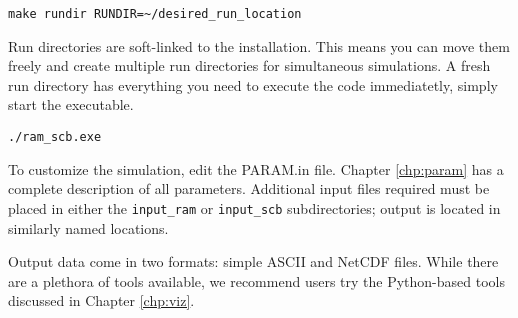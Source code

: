 \begin{verbatim}
make rundir RUNDIR=~/desired_run_location
\end{verbatim}

Run directories are soft-linked to the installation.  This means you can move them freely and create multiple run directories for simultaneous simulations. A fresh run directory has everything you need to execute the code immediatetly, simply start the executable.

\begin{verbatim}
./ram_scb.exe
\end{verbatim}

To customize the simulation, edit the PARAM.in file.  Chapter \ref{chp:param} has a complete description of all parameters.  Additional input files required must be placed in either the {\tt input\_ram} or {\tt input\_scb} subdirectories; output is located in similarly named locations.

Output data come in two formats: simple ASCII and NetCDF files.  While there are a plethora of tools available, we recommend users try the Python-based tools discussed in Chapter \ref{chp:viz}.